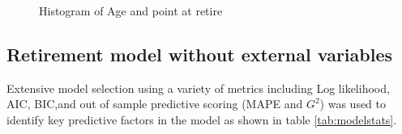 \documentclass[12pt,letterpaper]{article}
\begin{document}
\begin{figure}[h!]
	\centering
	\caption{Histogram of Age and point at retire}
	\label{fig:hist}
\end{figure}


\subsection{Retirement model without external variables}
Extensive model selection using a variety of metrics including Log likelihood, AIC, BIC,and out of sample predictive scoring (MAPE and $G^2$) was used to identify key predictive factors in the model as shown in table \ref{tab:modelstats}.
\end{document}
